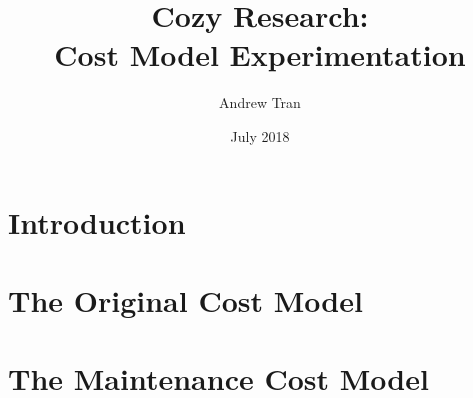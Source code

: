 \documentclass[12pt]{article}
\title{Cozy Research: \\ Cost Model Experimentation}
\author{Andrew Tran}
\date{July 2018}
\begin{document}
\maketitle

\section{Introduction}


\section{The Original Cost Model}


\section{The Maintenance Cost Model}

\end{document}
